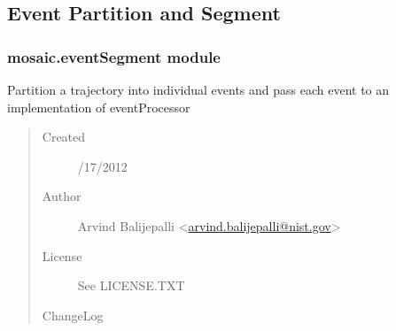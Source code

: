 \documentclass[letterpaper,10pt,english]{sphinxmanual}
\begin{document}
\subsection{Event Partition and Segment}
\label{api-doc/mosaic.partition:event-partition-and-segment}\label{api-doc/mosaic.partition::doc}

\subsubsection{mosaic.eventSegment module}
\label{api-doc/mosaic.partition:mosaic-eventsegment-module}\label{api-doc/mosaic.partition:module-mosaic.eventSegment}
Partition a trajectory into individual events and pass each event 
to an implementation of eventProcessor
\begin{quote}\begin{description}
\item[{Created}] /17/2012

\item[{Author}] \leavevmode
Arvind Balijepalli \textless{}\href{mailto:arvind.balijepalli@nist.gov}{arvind.balijepalli@nist.gov}\textgreater{}

\item[{License}] \leavevmode
See LICENSE.TXT

\item[{ChangeLog}] \leavevmode
\end{description}\end{quote}
\end{document}
